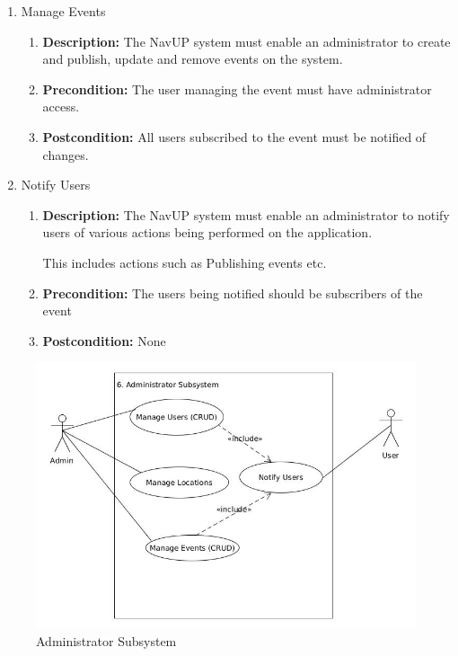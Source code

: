 \documentclass{article}
\begin{document}
\begin{enumerate}
\begin{enumerate}
		\item Manage Events
		\begin{enumerate}
			\item \textbf{Description:} The NavUP system must enable an administrator to create and publish, update and remove events on the system. 
			\item \textbf{Precondition:} The user managing the event must have administrator access. 
			\item \textbf{Postcondition:} All users subscribed to the event must be notified of changes.  \newline			
		\end{enumerate}	
		
		\item Notify Users
		\begin{enumerate}
			\item \textbf{Description:} The NavUP system must enable an administrator to notify users of various actions being performed on the application. 
			
			This includes actions such as Publishing events etc.
			\item \textbf{Precondition:} The users being notified should be subscribers of the event
			\item \textbf{Postcondition:} None		
		\end{enumerate}		
		
	\end{enumerate}
	
	\begin{figure}[h!]
		\includegraphics[scale=0.5]{Administrator.jpg}
		\caption{Administrator Subsystem}	
		\end{figure}
	
	\end{enumerate}
	
\end{document}

